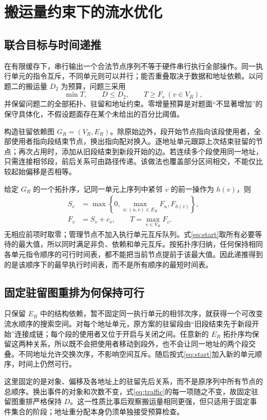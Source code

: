 \section{搬运量约束下的流水优化}
\subsection{联合目标与时间递推}
在有限缓存下，串行输出一个合法节点序列不等于硬件串行执行全部操作。同一执行单元的指令互斥，不同单元则可以并行；能否重叠取决于数据和地址依赖。以问题二的搬运量 $D_2$ 为预算，问题三采用
\begin{equation}
\min T,\qquad D\le D_2,\qquad T\ge F_v\ (v\in V_R),\label{eq:budget}
\end{equation}
并保留问题二的全部拓扑、驻留和地址约束。零增量预算是对题面“不显著增加”的保守具体化，不假设题面存在某个未给出的百分比阈值。

构造驻留依赖图 $G_R=(V_R,E_R)$。除原始边外，段开始节点指向该段使用者，全部使用者指向段结束节点，换出指向配对换入。逐地址单元跟踪上次结束驻留的节点；再次占用时，添加从旧段结束到新段开始的边。若连续多个段使用同一地址，只需连接相邻段，前后关系可由路径传递。该做法也覆盖部分区间相交，不能仅比较起始偏移是否相等。

给定 $G_R$ 的一个拓扑序，记同一单元上序列中紧邻 $v$ 的前一操作为 $h(v)$，则
\begin{align}
S_v&=\max\left\{0,\max_{u:(u,v)\in E_R}F_u,F_{h(v)}\right\},\label{eq:start}\\
F_v&=S_v+c_v,\qquad T=\max_{v\in V_R}F_v.\label{eq:finish}
\end{align}
无相应前项时取零；管理节点不加入执行单元互斥队列。式\eqref{eq:start}取所有必要等待的最大值，所以同时满足非负、依赖和单元互斥。按拓扑序归纳，任何保持相同各单元指令顺序的可行时间表，都不能把当前节点提前于该最大值。因此递推得到的是该顺序下的最早执行时间表，而不是所有顺序的最短时间表。

\subsection{固定驻留图重排为何保持可行}
只保留 $E_R$ 中的结构依赖，暂不固定同一执行单元的相邻次序，就获得一个可改变流水顺序的搜索空间。对每个地址单元，原方案的驻留段由“旧段结束先于新段开始”连接成链；每个段的使用者又位于开启与关闭之间。任意新的 $E_R$ 拓扑序均保留这两种关系，所以既不会把使用者移动到段外，也不会让同一地址的两个段交叠。不同地址允许交换次序，不影响空间互斥。随后按式\eqref{eq:start}加入新的单元顺序，时间上仍然可行。

这里固定的是对象、偏移及各地址上的驻留先后关系，而不是原序列中所有节点的总顺序。换出事件的对象和次数不变，式\eqref{eq:traffic}的每一项随之不变，故固定驻留图重排严格保持 $D$。这一性质比事后观察搬运量相同更强，但只适用于固定事件集合的阶段；地址重分配本身仍须单独接受预算检查。

